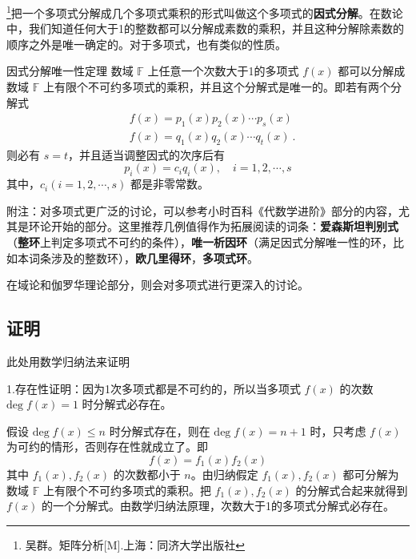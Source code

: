 
\footnote{吴群。矩阵分析[M].上海：同济大学出版社}把一个多项式分解成几个多项式乘积的形式叫做这个多项式的\textbf{因式分解}。在数论中，我们知道任何大于1的整数都可以分解成素数的乘积，并且这种分解除素数的顺序之外是唯一确定的。对于多项式，也有类似的性质。
\begin{theorem}{因式分解唯一性定理}
数域 $\mathbb{F}$ 上任意一个次数大于1的多项式 $f(x)$ 都可以分解成数域 $\mathbb{F}$ 上有限个不可约多项式的乘积，并且这个分解式是唯一的。即若有两个分解式
 \begin{equation}
 \begin{aligned}
 &f(x)=p_1(x)p_2(x)\cdots p_s(x)\\
 &f(x)=q_1(x)q_2(x)\cdots q_t(x)~.
 \end{aligned}
 \end{equation}
 则必有 $s=t$，并且适当调整因式的次序后有
 \begin{equation}
 p_i(x)=c_iq_i(x),\quad i=1,2,\cdots,s
 \end{equation}
 其中，$c_i(i=1,2,\cdots,s)$ 都是非零常数。
\end{theorem}


附注：对多项式更广泛的讨论，可以参考小时百科《代数学进阶》部分的内容，尤其是环论开始的部分。这里推荐几例值得作为拓展阅读的词条：\textbf{爱森斯坦判别式}（\textbf{整环}上判定多项式不可约的条件），\textbf{唯一析因环}（满足因式分解唯一性的环，比如本词条涉及的整数环），\textbf{欧几里得环}，\textbf{多项式环}。

在域论和伽罗华理论部分，则会对多项式进行更深入的讨论。


\subsection{证明}此处用数学归纳法来证明

1.存在性证明：因为1次多项式都是不可约的，所以当多项式 $f(x)$ 的次数 $\mathrm{deg}\;f(x)=1$ 时分解式必存在。

假设 $\mathrm{deg}\;f(x)\leq n$ 时分解式存在，则在 $\mathrm{deg}\;f(x)=n+1$ 时，只考虑 $f(x)$ 为可约的情形，否则存在性就成立了。即
\begin{equation}
f(x)=f_1(x)f_2(x)
\end{equation}
其中 $f_1(x),f_2(x)$ 的次数都小于 $n$。由归纳假定 $f_1(x),f_2(x)$ 都可分解为数域 $\mathbb{F}$ 上有限个不可约多项式的乘积。把 $f_1(x),f_2(x)$ 的分解式合起来就得到 $f(x)$ 的一个分解式。由数学归纳法原理，次数大于1的多项式分解式必存在。

